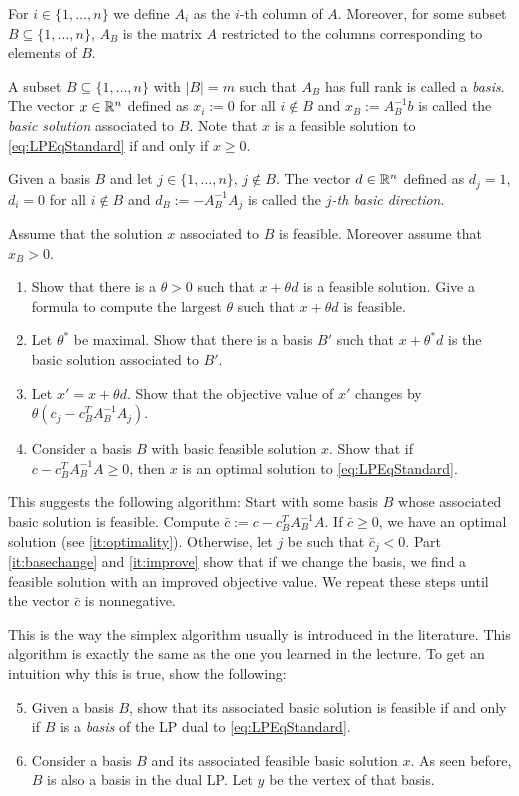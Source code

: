 \begin{enumerate}
For $i\in \{1, \ldots, n\}$ we define $A_i$ as the $i$-th column of $A$. Moreover, for some subset $B\subseteq \{1, \ldots, n\}$, $A_B$ is the matrix $A$ restricted to the columns corresponding to elements of $B$.

A subset $B\subseteq \{1, \ldots, n\}$ with $|B|=m$ such that $A_B$ has full rank is called a \emph{basis}.
The vector $x\in \mathbb{R}^n$ defined as $x_i := 0$ for all $i\notin B$ and $x_B:=A_B^{-1}b$ is called the \emph{basic solution} associated to $B$.
Note that $x$ is a feasible solution to \eqref{eq:LPEqStandard} if and only if $x\geq 0$.



Given a basis $B$ and let $j\in \{1, \ldots, n\}$, $j\notin B$. The vector $d\in \mathbb{R}^n$ defined as $d_j = 1$, $d_i=0$ for all $i\notin B$ and
$d_B := - A_B^{-1} A_j$ is called the \emph{$j$-th basic direction}.

Assume that the solution $x$ associated to $B$ is feasible. Moreover assume that $x_B>0$.
\begin{enumerate}
 \item Show that there is a $\theta >0$ such that $x+ \theta d$ is a feasible solution. Give a formula to compute the largest $\theta$ such that $x+ \theta d$ is feasible.
 \item \label{it:basechange} Let $\theta^*$ be maximal. Show that there is a basis $B'$ such that $x+ \theta^* d$ is the basic solution associated to $B'$.
 \item \label{it:improve} Let $x'=x+\theta d$. Show that the objective value of $x'$ changes by $\theta \left(c_j - c_B^TA_B^{-1} A_j\right)$.
 \item \label{it:optimality} Consider a basis $B$ with basic feasible solution $x$. Show that if $c - c_B^T A_B^{-1} A \geq 0 $, then $x$ is an optimal solution to \eqref{eq:LPEqStandard}.
\end{enumerate}
This suggests the following algorithm: Start with some basis $B$ whose associated basic solution is feasible. Compute $\bar c := c - c_B^T A_B^{-1} A$. If $\bar c \geq 0$, we have an optimal solution (see \ref{it:optimality}). Otherwise, let $j$ be such that $\bar c_j < 0$. Part \ref{it:basechange} and \ref{it:improve} show that if we change the basis, 
we find a feasible solution with an improved objective value. We repeat these steps until the vector $\bar c$ is nonnegative.

This is the way the simplex algorithm usually is introduced in the literature. This algorithm is exactly the same as the one you learned in the lecture.
To get an intuition why this is true, show the following:
\begin{enumerate}
\setcounter{enumi}{4}
\item Given a basis $B$, show that its associated basic solution is feasible if and only if $B$ is a \emph{basis} of the LP dual to \eqref{eq:LPEqStandard}.
 \item Consider a basis $B$ and its associated feasible basic solution $x$. As seen before, $B$ is also a basis in the dual LP. 
  Let $y$ be the vertex of that basis. 


\end{enumerate}
\end{enumerate}
